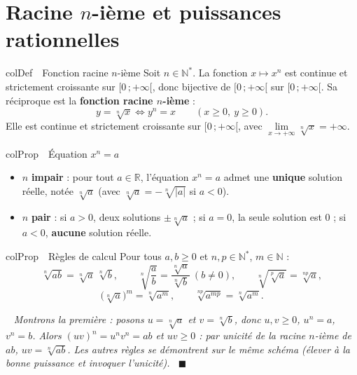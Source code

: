 \documentclass[11pt,a4paper]{article}
\newenvironment{definition}[1][Définition]
  {\begin{fiche}{colDef}{\ding{110}~~#1}}{\end{fiche}}
\newenvironment{propriete}[1][Propriété]
  {\begin{fiche}{colProp}{\ding{72}~~#1}}{\end{fiche}}
\newenvironment{demo}
  {\par\smallskip\noindent{\sffamily\bfseries\color{qtealdark}Démonstration.}\ \itshape}
  {\ \normalfont\hfill$\blacksquare$\par\medskip}
\begin{document}
\section{Racine $n$-ième et puissances rationnelles}

\begin{definition}[Fonction racine $n$-ième]
Soit $n \in \mathbb{N}^*$. La fonction $x \mapsto x^n$ est continue et strictement croissante sur $[0\,;+\infty[$, donc bijective de $[0\,;+\infty[$ sur $[0\,;+\infty[$. Sa réciproque est la \textbf{fonction racine $n$-ième} :
\[
  y = \sqrt[n]{x} \iff y^n = x \qquad (x \geq 0,\ y \geq 0).
\]
Elle est continue et strictement croissante sur $[0\,;+\infty[$, avec $\lim\limits_{x \to +\infty} \sqrt[n]{x} = +\infty$.
\end{definition}

\begin{propriete}[Équation $x^n = a$]
\begin{itemize}[leftmargin=6mm, itemsep=0.5mm]
  \item $n$ \textbf{impair} : pour tout $a \in \mathbb{R}$, l'équation $x^n = a$ admet une \textbf{unique} solution réelle, notée $\sqrt[n]{a}$ (avec $\sqrt[n]{a} = -\sqrt[n]{|a|}$ si $a < 0$).
  \item $n$ \textbf{pair} : si $a > 0$, deux solutions $\pm\sqrt[n]{a}$ ; si $a = 0$, la seule solution est $0$ ; si $a < 0$, \textbf{aucune} solution réelle.
\end{itemize}
\end{propriete}

\begin{propriete}[Règles de calcul]
Pour tous $a, b \geq 0$ et $n, p \in \mathbb{N}^*$, $m \in \mathbb{N}$ :
\[
  \sqrt[n]{ab} = \sqrt[n]{a}\,\sqrt[n]{b}, \qquad
  \sqrt[n]{\frac{a}{b}} = \frac{\sqrt[n]{a}}{\sqrt[n]{b}}\ (b \neq 0), \qquad
  \sqrt[n]{\sqrt[p]{a}} = \sqrt[np]{a},
\]
\[
  \bigl(\sqrt[n]{a}\bigr)^m = \sqrt[n]{a^m}, \qquad
  \sqrt[np]{a^{mp}} = \sqrt[n]{a^m}.
\]
\end{propriete}

\begin{demo}
Montrons la première : posons $u = \sqrt[n]{a}$ et $v = \sqrt[n]{b}$, donc $u, v \geq 0$, $u^n = a$, $v^n = b$. Alors $(uv)^n = u^n v^n = ab$ et $uv \geq 0$ : par \emph{unicité} de la racine $n$-ième de $ab$, $uv = \sqrt[n]{ab}$. Les autres règles se démontrent sur le même schéma (élever à la bonne puissance et invoquer l'unicité).
\end{demo}
\end{document}
